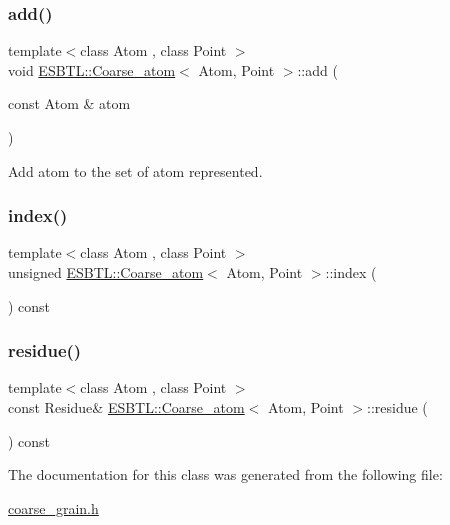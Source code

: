 \subsubsection{\texorpdfstring{add()}{add()}}
{\footnotesize\ttfamily template$<$class Atom , class Point $>$ \\
void \hyperlink{classESBTL_1_1Coarse__atom}{E\+S\+B\+T\+L\+::\+Coarse\+\_\+atom}$<$ Atom, Point $>$\+::add (\begin{DoxyParamCaption}\item[{const Atom \&}]{atom }\end{DoxyParamCaption})\hspace{0.3cm}{\ttfamily [inline]}}

Add atom to the set of atom represented. \mbox{\label{classESBTL_1_1Coarse__atom_adf0d8955c898d77d6040dec96be9fed1}} 
\subsubsection{\texorpdfstring{index()}{index()}}
{\footnotesize\ttfamily template$<$class Atom , class Point $>$ \\
unsigned \hyperlink{classESBTL_1_1Coarse__atom}{E\+S\+B\+T\+L\+::\+Coarse\+\_\+atom}$<$ Atom, Point $>$\+::index (\begin{DoxyParamCaption}{ }\end{DoxyParamCaption}) const\hspace{0.3cm}{\ttfamily [inline]}}

\mbox{\label{classESBTL_1_1Coarse__atom_ab07cf33f1040349d5af862f147dbc022}} 
\subsubsection{\texorpdfstring{residue()}{residue()}}
{\footnotesize\ttfamily template$<$class Atom , class Point $>$ \\
const Residue\& \hyperlink{classESBTL_1_1Coarse__atom}{E\+S\+B\+T\+L\+::\+Coarse\+\_\+atom}$<$ Atom, Point $>$\+::residue (\begin{DoxyParamCaption}{ }\end{DoxyParamCaption}) const\hspace{0.3cm}{\ttfamily [inline]}}



The documentation for this class was generated from the following file\+:\begin{DoxyCompactItemize}
\item 
\hyperlink{coarse__grain_8h}{coarse\+\_\+grain.\+h}\end{DoxyCompactItemize}

